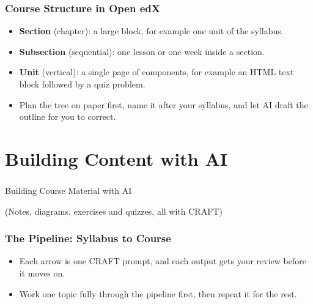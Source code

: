 \begin{frame}[fragile]\frametitle{Course Structure in Open edX}
\begin{itemize}
\item \textbf{Section} (chapter): a large block, for example one unit of the syllabus.
\item \textbf{Subsection} (sequential): one lesson or one week inside a section.
\item \textbf{Unit} (vertical): a single page of components, for example an HTML text block followed by a quiz problem.
\item Plan the tree on paper first, name it after your syllabus, and let AI draft the outline for you to correct.
\end{itemize}
\end{frame}

\section[Build]{Building Content with AI}

\begin{frame}[fragile]\frametitle{}
\begin{center}
{\Large Building Course Material with AI}

\medskip
{\small (Notes, diagrams, exercises and quizzes, all with CRAFT)}
\end{center}
\end{frame}

\begin{frame}[fragile]\frametitle{The Pipeline: Syllabus to Course}
\begin{center}
\end{center}
\begin{itemize}
\item Each arrow is one CRAFT prompt, and each output gets your review before it moves on.
\item Work one topic fully through the pipeline first, then repeat it for the rest.
\end{itemize}
\end{frame}

